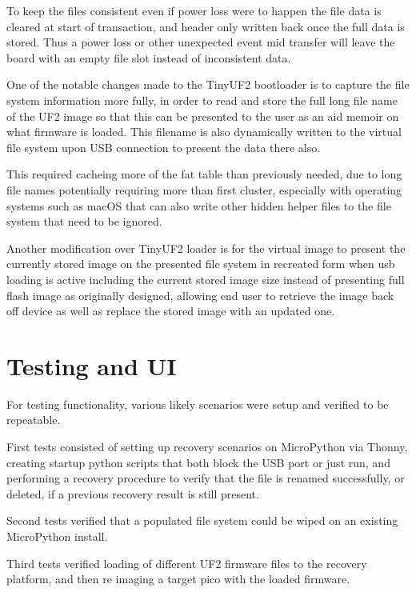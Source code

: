 To keep the files consistent even if power loss were to happen the file data is cleared at start of transaction, and header only written back once the full data is stored. Thus a power loss or other unexpected event mid transfer will leave the board with an empty file slot instead of inconsistent data.

One of the notable changes made to the TinyUF2 bootloader is to capture the file system information more fully, in order to read and store the full long file name of the UF2 image so that this can be presented to the user as an aid memoir on what firmware is loaded. This filename is also dynamically written to the virtual file system upon USB connection to present the data there also.

This required cacheing more of the \gls{fat} table than previously needed, due to long file names potentially requiring more than first cluster, especially with operating systems such as macOS that can also write other hidden helper files to the file system that need to be ignored.

Another modification over TinyUF2 loader is for the virtual image to present the currently stored image on the presented file system in recreated form when \gls{usb} loading is active including the current stored image size instead of presenting full flash image as originally designed, allowing end user to retrieve the image back off device as well as replace the stored image with an updated one.

\pagebreak
\section{Testing and UI}

For testing functionality, various likely scenarios were setup and verified to be repeatable.

First tests consisted of setting up recovery scenarios on MicroPython via Thonny\cite{ThonnyPythonIDE}, creating startup python scripts that both block the USB port or just run, and performing a recovery procedure to verify that the file is renamed successfully, or deleted, if a previous recovery result is still present.

Second tests verified that a populated file system could be wiped on an existing MicroPython install.

Third tests verified loading of different UF2 firmware files to the recovery platform, and then re imaging a target pico with the loaded firmware.

